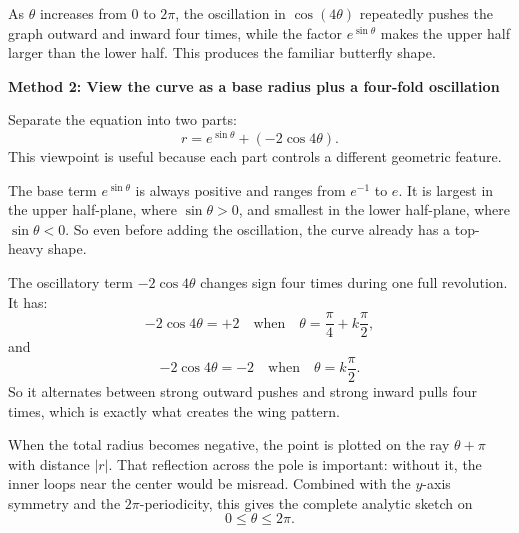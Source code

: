 \documentclass[a4paper,12pt,twocolumn]{article}
\newenvironment{solutionbox}{\begin{framed}}{\end{framed}}
\begin{document}
\begin{solutionbox}
\begin{steps}
\item As \(\theta\) increases from \(0\) to \(2\pi\), the oscillation in \(\cos(4\theta)\) repeatedly pushes the graph outward and inward four times, while the factor \(e^{\sin\theta}\) makes the upper half larger than the lower half. This produces the familiar butterfly shape.
\end{steps}
\end{solutionbox}

\begin{solutionbox}
\textbf{Method 2: View the curve as a base radius plus a four-fold oscillation}

\begin{steps}
\item Separate the equation into two parts:
\[
r=e^{\sin\theta}+(-2\cos 4\theta).
\]
This viewpoint is useful because each part controls a different geometric feature.

\item The base term \(e^{\sin\theta}\) is always positive and ranges from \(e^{-1}\) to \(e\). It is largest in the upper half-plane, where \(\sin\theta>0\), and smallest in the lower half-plane, where \(\sin\theta<0\). So even before adding the oscillation, the curve already has a top-heavy shape.

\item The oscillatory term \(-2\cos 4\theta\) changes sign four times during one full revolution. It has:
\[
-2\cos 4\theta=+2
\quad\text{when}\quad
\theta=\frac{\pi}{4}+k\frac{\pi}{2},
\]
and
\[
-2\cos 4\theta=-2
\quad\text{when}\quad
\theta=k\frac{\pi}{2}.
\]
So it alternates between strong outward pushes and strong inward pulls four times, which is exactly what creates the wing pattern.

\item When the total radius becomes negative, the point is plotted on the ray \(\theta+\pi\) with distance \(|r|\). That reflection across the pole is important: without it, the inner loops near the center would be misread. Combined with the \(y\)-axis symmetry and the \(2\pi\)-periodicity, this gives the complete analytic sketch on
\[
0\le \theta\le 2\pi.
\]
\end{steps}
\end{solutionbox}
\end{document}
